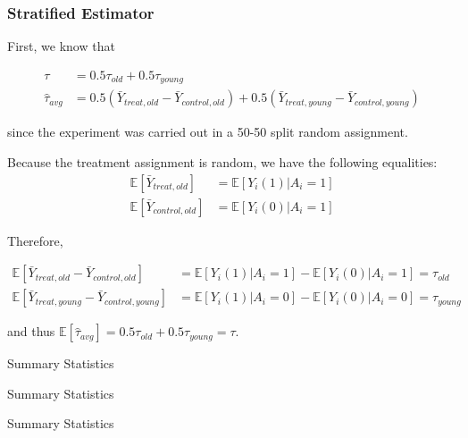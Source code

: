 \documentclass[11pt]{article}
\numberwithin{equation}{section}
\newcommand{\E}{\mathbb{E}}
\begin{document}
\subsubsection{Stratified Estimator}

First, we know that

\begin{align}
    \tau &= 0.5\tau_{old} + 0.5\tau_{young}\\
    \hat{\tau}_{avg} &= 0.5 \left(\bar{Y}_{treat,old} - \bar{Y}_{control,old}\right) + 0.5 \left(\bar{Y}_{treat,young} - \bar{Y}_{control,young}\right) 
\end{align}

since the experiment was carried out in a 50-50 split random assignment.

Because the treatment assignment is random, we have the following equalities:
\begin{align}
    \E[\bar{Y}_{treat,old}] &= \E[Y_i(1) | A_i=1] \\
    \E[\bar{Y}_{control,old}] &= \E[Y_i(0) | A_i=1]
\end{align}

Therefore,

\begin{align}
    \E[\bar{Y}_{treat,old} - \bar{Y}_{control,old}] &= \E[Y_i(1) | A_i=1] - \E[Y_i(0) | A_i=1] = \tau_{old}\\
    \E[\bar{Y}_{treat,young} - \bar{Y}_{control,young}] &= \E[Y_i(1) | A_i=0] - \E[Y_i(0) | A_i=0] = \tau_{young}
\end{align}

and thus $\E[\hat{\tau}_{avg}] = 0.5\tau_{old} + 0.5\tau_{young} = \tau$.



\appendix
\setcounter{figure}{0}                      
\setcounter{table}{0}                      
\renewcommand\thefigure{A.\arabic{figure}} 
\renewcommand\thetable{A.\arabic{table}} 

\begin{table}
    \centering
    \tiny
    
    \caption{\label{tab:summary_stats}Summary Statistics}
\end{table}


\begin{table}
    \centering
    \tiny
    
    \caption{\label{tab:summary_stats(control_group)}Summary Statistics}
\end{table}


\begin{table}
    \centering
    \tiny
    
    \caption{\label{tab:summary_stats(treated_group)}Summary Statistics}
\end{table}


\printbibliography
\end{document}
